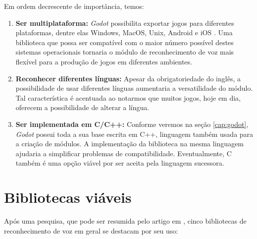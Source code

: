 Em ordem decrescente de importância, temos:

\begin{enumerate}
\item \textbf{Ser multiplataforma:} \textit{Godot} possibilita exportar jogos para diferentes plataformas, dentre elas Windows, MacOS, Unix, Android e iOS \citep{godotDeployPlatforms}. Uma biblioteca que possa ser compatível com o maior número possível destes sistemas operacionais tornaria o módulo de reconhecimento de voz mais flexível para a produção de jogos em diferentes ambientes.

\item \textbf{Reconhecer diferentes línguas:} Apesar da obrigatoriedade do inglês, a possibilidade de usar diferentes línguas aumentaria a versatilidade do módulo. Tal característica é acentuada ao notarmos que muitos jogos, hoje em dia, oferecem a possibilidade de alterar a língua.

\item \textbf{Ser implementada em C/C++:} Conforme veremos na seção \ref{cap:godot}, \textit{Godot} possui toda a sua base escrita em C++, linguagem também usada para a criação de módulos. A implementação da biblioteca na mesma linguagem ajudaria a simplificar problemas de compatibilidade. Eventualmente, C também é uma opção viável por ser aceita pela linguagem sucessora.
\end{enumerate}


\section{Bibliotecas viáveis}

Após uma pesquisa, que pode ser resumida pelo artigo em \citep{speechRecog:16}, cinco bibliotecas de reconhecimento de voz em geral se destacam por seu uso:

